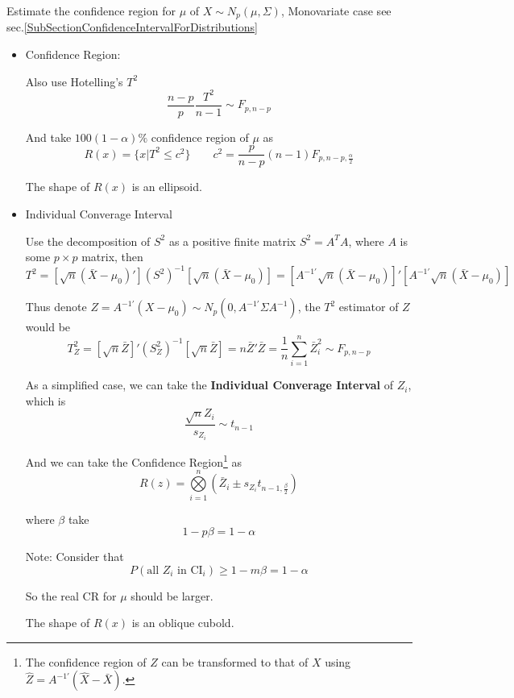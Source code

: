     Estimate the confidence region for $ \mu $ of $ X\sim N_p(\mu,\Sigma ) $, Monovariate case see sec.\ref{SubSectionConfidenceIntervalForDistributions}
\begin{itemize}
    \item Confidence Region:

    Also use Hotelling's $ T^2 $
    \[
         \dfrac{n-p}{p}\dfrac{T^2}{n-1}\sim F_{p,n-p}
    \]
    
    And take $ 100(1-\alpha )\% $ confidence region of $ \mu $ as
    \[
        R(x)=\{x|T^2\leq c^2\}\qquad c^2=\dfrac{p}{n-p}(n-1)F_{p,n-p,\frac{\alpha }{2}} 
    \]

    The shape of $ R(x) $ is an ellipsoid.
    


    \item Individual Converage Interval
    
    Use the decomposition of $ S^2 $ as a positive finite matrix $ S^2=A^TA $, where $ A $ is some $ p\times p $ matrix, then
    \[
        T^2= [\sqrt{n}(\bar{X}-\mu_0)'](S^2)^{-1}[\sqrt{n}(\bar{X}-\mu _0)]=[A^{-1\prime}\sqrt{n}(\bar{X}-\mu_0)]'[A^{-1\prime}\sqrt{n}(\bar{X}-\mu_0)]
    \]

    Thus denote $ Z=A^{-1\prime}(X-\mu_0) \sim N_p(0,A^{-1\prime}\Sigma A^{-1}) $, the $ T^2 $ estimator of $ Z $ would be
    \[
        T_Z^2=[\sqrt{n}\bar{Z}]'(S_Z^2)^{-1} [\sqrt{n}\bar{Z}]=n\bar{Z}'\bar{Z}=\dfrac{1}{n}\sum_{i=1}^n\bar{Z}_i^2\sim F_{p,n-p}
    \]

    As a simplified case, we can take the \textbf{Individual Converage Interval} of $ Z_i $, which is 
    \[
        \dfrac{\sqrt{n}Z_i}{s_{Z_i}}\sim t_{n-1} 
    \]
    
    And we can take the Confidence Region\footnote{The confidence region of $ Z $ can be transformed to that of $ X $ using $ \hat{Z}=A^{-1\prime}(\hat{X}-\bar{X}) $. } as
    \[
        R(z)= \bigotimes\limits_{i=1}^n(\bar{Z}_i\pm s_{Z_i}t_{n-1,\frac{\beta }{2}})
    \]
    
    where $ \beta  $ take 
    \[
        1-p\beta =1-\alpha  
    \]
    
    Note: Consider that
    \[
        P(\text{all }Z_i\text{ in CI}_i)\geq 1-m\beta =1-\alpha  
    \]

    So the real CR for $ \mu $ should be larger.
    
    
    
    
    
    
    
    


    The shape of $ R(x) $ is an oblique cubold.
    
\end{itemize}
        





